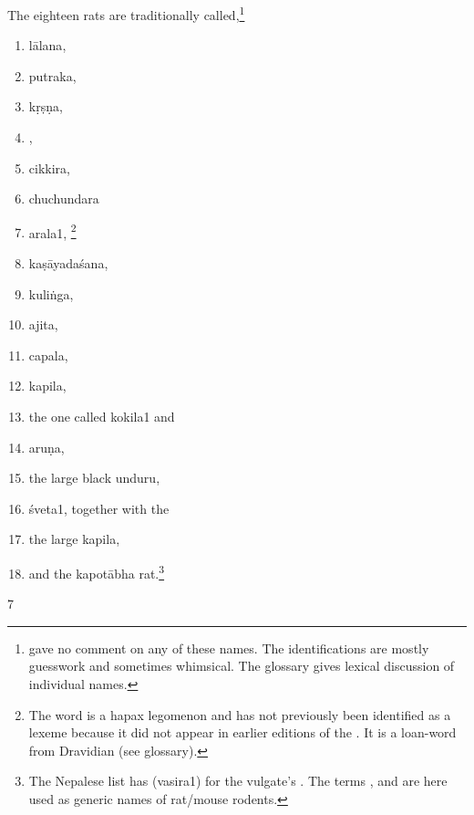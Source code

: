 \begin{translation}
    The eighteen rats are traditionally called,\footnote{ 
    gave no 
    comment on any of these names.  The identifications are 
    mostly guesswork and sometimes whimsical.  The glossary gives lexical 
    discussion of individual names.}
    \begin{enumerate}
        \item \Gls{lālana},
        \item \Gls{putraka},
        \item \Gls{kṛṣṇa},
        \item {},
        \item \Gls{cikkira}, %
        \item \Gls{chuchundara} %
        \item \Gls{arala1},%
\footnote{The word  is a hapax legomenon and has not 
previously been identified as a lexeme because it did not appear in earlier 
editions of the \SS.  It is a loan-word from Dravidian (see glossary).}        
        \item \Gls{kaṣāyadaśana},
        \item \Gls{kuliṅga},
        \item \Gls{ajita},
        \item \Gls{capala},
        \item \Gls{kapila},
        \item the one called \Gls{kokila1} and 
        \item \Gls{aruṇa},
        \item the large black \Gls{unduru}, 
        \item \Gls{śveta1}, together with the
        \item the large \Gls{kapila},
        \item and the \Gls{kapotābha} rat.\footnote{The Nepalese list has 
         (\Gls{vasira1}) for the 
        vulgate's .  The terms ,  and 
         are here used as generic names of rat/mouse rodents.}
\end{enumerate}
    
\item[7]


\end{translation}
